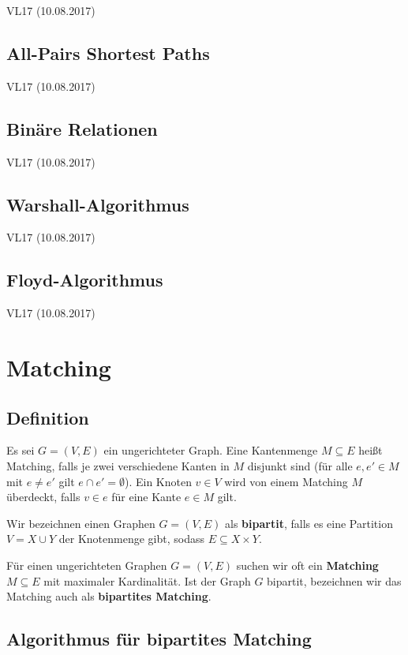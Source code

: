 \documentclass[12pt]{article}
\begin{document}
VL17 (10.08.2017)

\subsection{All-Pairs Shortest Paths}

VL17 (10.08.2017)

\subsection{Binäre Relationen}

VL17 (10.08.2017)

\subsection{Warshall-Algorithmus}

VL17 (10.08.2017)

\subsection{Floyd-Algorithmus}

VL17 (10.08.2017)

\section{Matching}

\subsection{Definition}

Es sei $G = (V, E)$ ein ungerichteter Graph. Eine Kantenmenge $M \subseteq E$ heißt Matching, falls je zwei verschiedene Kanten in $M$ disjunkt sind (für alle $e, e' \in M$ mit $e \neq e'$ gilt $e \cap e' = \emptyset$). Ein Knoten $v \in V$ wird von einem Matching $M$ überdeckt, falls $v \in e$ für eine Kante $e \in M$ gilt.

Wir bezeichnen einen Graphen $G = (V, E)$ als \textbf{bipartit}, falls es eine Partition $V = X \cup Y$ der Knotenmenge gibt, sodass $E \subseteq X \times Y$.

Für einen ungerichteten Graphen $G = (V, E)$ suchen wir oft ein \textbf{Matching} $M \subseteq E$ mit maximaler Kardinalität. Ist der Graph $G$ bipartit, bezeichnen wir das Matching auch als \textbf{bipartites Matching}.

\subsection{Algorithmus für bipartites Matching}
\end{document}
